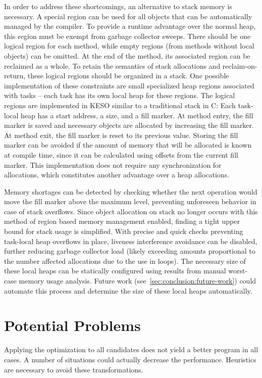 			In order to address these shortcomings, an alternative to stack memory is necessary. A special region can be used
			for all objects that can be automatically managed by the compiler. To provide a runtime advantage over the normal
			heap, this region must be exempt from garbage collector sweeps. There should be one logical region for each
			method, while empty regions (from methods without local objects) can be omitted. At the end of the method, its
			associated region can be reclaimed as a whole. To retain the semantics of stack allocations and reclaim-on-return,
			these logical regions should be organized in a stack. One possible implementation of these constraints are small
			specialized heap regions associated with tasks – each task has its own local heap for these regions. The logical
			regions are implemented in KESO similar to a traditional stack in C: Each task-local heap has a start address,
			a size, and a fill marker. At method entry, the fill marker is saved and necessary objects are allocated by
			increasing the fill marker. At method exit, the fill marker is reset to its previous value. Storing the fill
			marker can be avoided if the amount of memory that will be allocated is known at compile time, since it can be
			calculated using offsets from the current fill marker. This implementation does not require any synchronization
			for allocations, which constitutes another advantage over a heap allocations.

			Memory shortages can be detected by checking whether the next operation would move the fill marker above the
			maximum level, preventing unforeseen behavior in case of stack overflows. Since object allocation on stack no
			longer occurs with this method of region based memory management enabled, finding a tight upper bound for stack
			usage is simplified. With precise and quick checks preventing task-local heap overflows in place, liveness
			interference avoidance can be disabled, further reducing garbage collector load (likely exceeding amounts
			proportional to the number affected allocations due to the use in loops). The necessary size of these local heaps
			can be statically configured using results from manual worst-case memory usage analysis. Future work
			(see~\cref{sec:conclusion:future-work}) could automate this process and determine the size of these local heaps
			automatically.

	\section{Potential Problems}
		\label{sec:eea:probs}
		Applying the optimization to all candidates does not yield a better program in all cases. A number of situations
		could actually decrease the performance. Heuristics are necessary to avoid these transformations.

